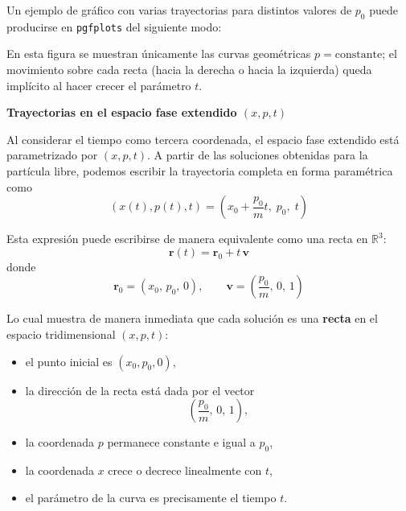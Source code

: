 \documentclass{article}
\begin{document}
Un ejemplo de gráfico con varias trayectorias para distintos valores de $p_{0}$
puede producirse en \texttt{pgfplots} del siguiente modo:

\begin{center}
\end{center}

En esta figura se muestran únicamente las curvas geométricas $p=\text{constante}$;
el movimiento sobre cada recta (hacia la derecha o hacia la izquierda) queda
implícito al hacer crecer el parámetro $t$.

\vspace{0.3cm}
\textcolor{trueblue}{\textbf{Trayectorias en el espacio fase extendido $(x,p,t)$}}

Al considerar el tiempo como tercera coordenada, el espacio fase extendido está
parametrizado por $(x,p,t)$.  
A partir de las soluciones obtenidas para la partícula libre, podemos escribir la
trayectoria completa en forma paramétrica como
\[
(x(t),p(t),t)
= \left(x_{0} + \frac{p_{0}}{m}t,\; p_{0},\; t\right)
\]

Esta expresión puede escribirse de manera equivalente como una recta en $\mathbb{R}^{3}$:
\[
\mathbf{r}(t) = \mathbf{r}_{0} + t\,\mathbf{v}
\]
donde
\[
\mathbf{r}_{0} = (x_{0},\,p_{0},\,0),
\qquad
\mathbf{v} = \left(\frac{p_{0}}{m},\,0,\,1\right)
\]

Lo cual muestra de manera inmediata que cada solución es una \textbf{recta}
en el espacio tridimensional $(x,p,t)$:

\begin{itemize}
  \item el punto inicial es $(x_{0},p_{0},0)$,
  \item la dirección de la recta está dada por el vector 
  \[
    \left(\frac{p_{0}}{m},\,0,\,1\right),
  \]
  \item la coordenada $p$ permanece constante e igual a $p_{0}$,
  \item la coordenada $x$ crece o decrece linealmente con $t$,
  \item el parámetro de la curva es precisamente el tiempo $t$.
\end{itemize}
\end{document}
